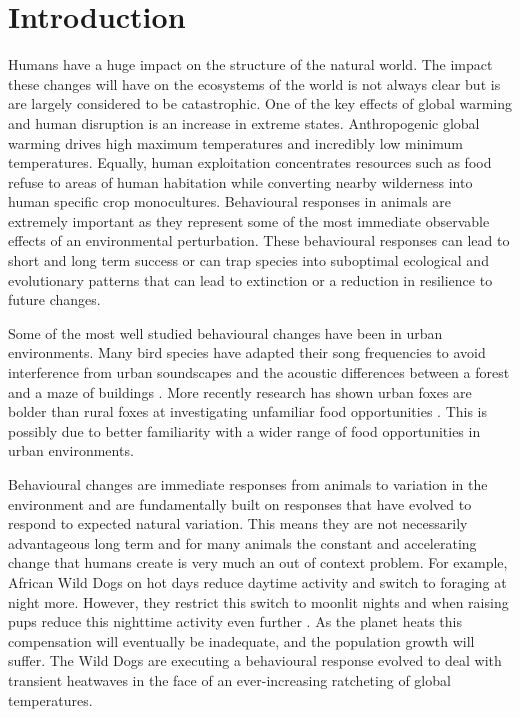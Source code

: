 \section{Introduction}

Humans have a huge impact on the structure of the natural world. The impact these changes will have on the ecosystems of the world is not always clear but is are largely considered to be catastrophic. 
One of the key effects of global warming and human disruption is an increase in extreme states. Anthropogenic global warming drives high maximum temperatures and incredibly low minimum temperatures. Equally, human exploitation concentrates resources such as food refuse to areas of human habitation while converting nearby wilderness into human specific crop monocultures.  
Behavioural responses in animals are extremely important as they represent some of the most immediate observable effects of an environmental perturbation. These behavioural responses can lead to short and long term success or can trap species into suboptimal ecological and evolutionary patterns that can lead to extinction or a reduction in resilience to future changes.

Some of the most well studied behavioural changes have been in urban environments. Many bird species have adapted their song frequencies to avoid interference from urban soundscapes and the acoustic differences between a forest and a maze of buildings \parencite{slabbekoornEcologyBirdsSing2003}. 
More recently research has shown urban foxes are bolder than rural foxes at investigating unfamiliar food opportunities \parencite{mortonUrbanFoxesAre2023}. This is possibly due to better familiarity with a wider range of food opportunities in urban environments.

Behavioural changes are immediate responses from animals to variation in the environment and are fundamentally built on responses that have evolved to respond to expected natural variation. This means they are not necessarily advantageous long term and for many animals the constant and accelerating change that humans create is very much an out of context problem. For example, African Wild Dogs on hot days reduce daytime activity and switch to foraging at night more. However, they restrict this switch to moonlit nights and when raising pups reduce this nighttime activity even further \parencite{rabaiottiCopingClimateChange2019}. As the planet heats this compensation will eventually be inadequate, and the population growth will suffer. The Wild Dogs are executing a behavioural response evolved to deal with transient heatwaves in the face of an ever-increasing ratcheting of global temperatures. 


